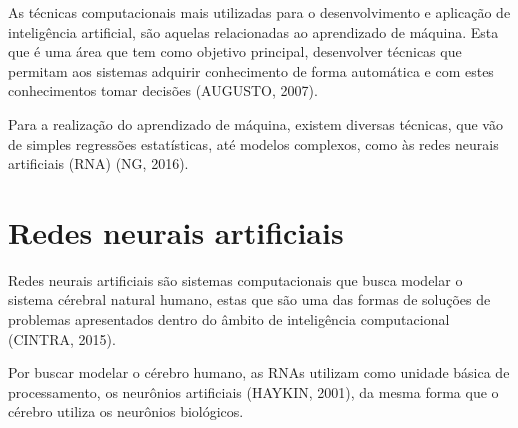 As técnicas computacionais mais utilizadas para o desenvolvimento e aplicação de inteligência artificial, são aquelas relacionadas ao aprendizado de máquina. Esta que é uma área que tem como objetivo principal, desenvolver técnicas que permitam aos sistemas adquirir conhecimento de forma automática e com estes conhecimentos tomar decisões (AUGUSTO, 2007).

Para a realização do aprendizado de máquina, existem diversas técnicas, que vão de simples regressões estatísticas, até modelos complexos, como às redes neurais artificiais (RNA) (NG, 2016).

\section{Redes neurais artificiais}


Redes neurais artificiais são sistemas computacionais que busca modelar o sistema cérebral natural humano, estas que são uma das formas de soluções de problemas apresentados dentro do âmbito de inteligência computacional (CINTRA, 2015).

Por buscar modelar o cérebro humano, as RNAs utilizam como unidade básica de processamento, os neurônios artificiais (HAYKIN, 2001), da mesma forma que o cérebro utiliza os neurônios biológicos. %



